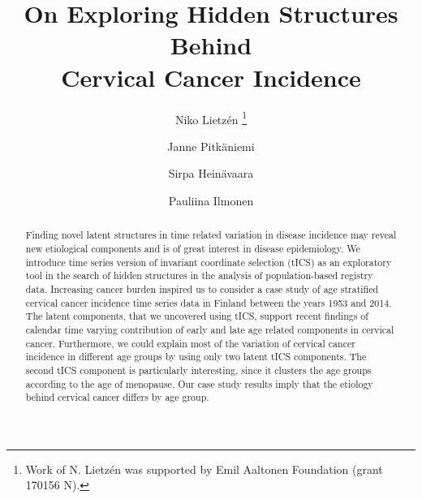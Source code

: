 \documentclass{llncs}
\begin{document}
\title{On Exploring Hidden Structures Behind\\ Cervical Cancer Incidence}
\author{Niko Lietz\'{e}n \thanks{Work of N. Lietz\'{e}n was supported by Emil Aaltonen Foundation (grant 170156 N).}  \and Janne Pitk{\"a}niemi  \and Sirpa Hein{\"a}vaara  \and Pauliina Ilmonen }





\maketitle




\begin{abstract}
Finding novel latent structures in time related variation in disease incidence  may reveal new etiological components and is of great interest in disease  epidemiology. We introduce  time series version of invariant coordinate selection (tICS) as an exploratory tool in the search of hidden structures in the analysis of population-based registry data.  Increasing cancer burden inspired us to consider  a case study of age stratified cervical cancer incidence time series data in Finland between the years 1953 and 2014. The latent components, that we uncovered using tICS, support recent findings of calendar time varying contribution of early and late age related components in cervical cancer. 
Furthermore, we could explain most of the variation of cervical cancer incidence in different age groups by using only two latent tICS components. The second tICS component is particularly interesting, since it clusters the age groups according to the age of menopause. Our case study results imply that the etiology behind cervical cancer differs by age group. 
\end{abstract}
\end{document}
